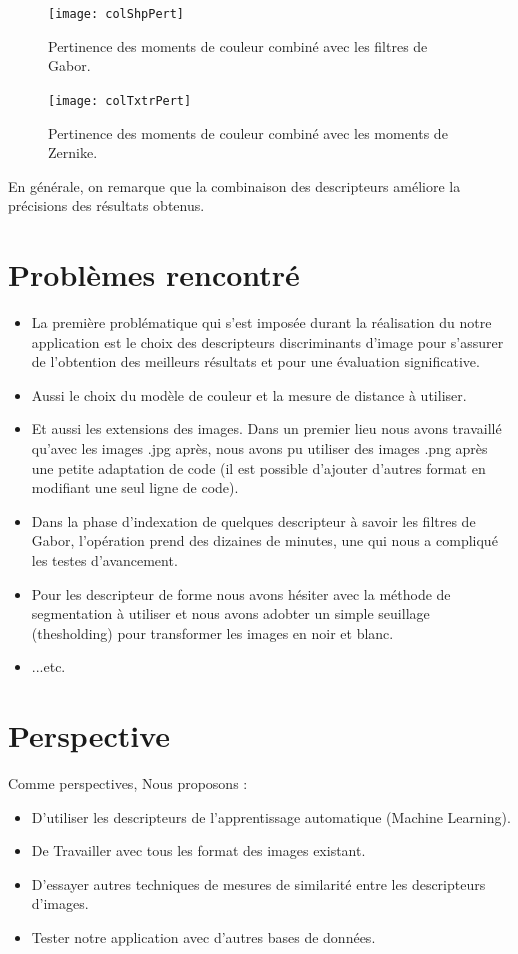 \begin{figure}[H]
	\centering
	\texttt{[image: colShpPert]} 
	\caption{Pertinence des moments de couleur combiné avec les filtres de Gabor.}
\end{figure}

\begin{figure}[H]
	\centering
	\texttt{[image: colTxtrPert]} 
	\caption{Pertinence des moments de couleur combiné avec les moments de Zernike.}
\end{figure}
En générale, on remarque que la combinaison des descripteurs améliore la précisions des résultats obtenus. 
\section{Problèmes rencontré}
\begin{itemize}
	\item La première problématique qui s’est imposée durant la réalisation du notre
	application est le choix des descripteurs discriminants d’image pour s’assurer de
	l’obtention des meilleurs résultats et pour une évaluation significative.
	\item Aussi le choix du modèle de couleur et la mesure de distance à utiliser.
	
	\item Et aussi les extensions des images. Dans un premier lieu nous avons travaillé
	qu’avec les images .jpg après, nous avons pu utiliser des images .png après une
	petite adaptation de code (il est possible d'ajouter d'autres format en modifiant une seul ligne de code).
	
	\item Dans la phase d'indexation de quelques descripteur à savoir les filtres de Gabor, l'opération prend des dizaines de minutes, une qui nous a compliqué les testes d'avancement.
	\item Pour les descripteur de forme nous avons hésiter avec la méthode de segmentation à utiliser et nous avons adobter un simple seuillage (thesholding) pour transformer les images en noir et blanc.
	\item ...etc.
\end{itemize}
\section{Perspective}
Comme perspectives, Nous proposons :
\begin{itemize}
	\item D’utiliser les descripteurs de l'apprentissage automatique (Machine Learning).
	
	\item De Travailler avec tous les format des images existant.
	\item D’essayer autres techniques de mesures de similarité entre les descripteurs
	d’images.
    \item Tester notre application avec d’autres bases de données.
\end{itemize}
